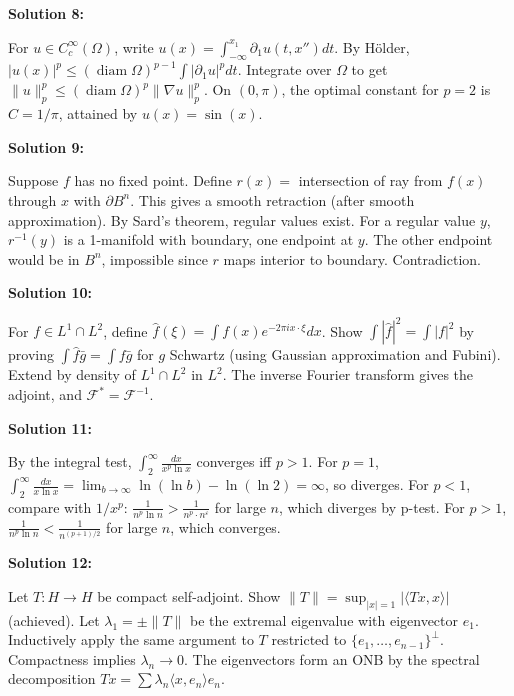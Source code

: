 \documentclass[12pt,a4paper]{exam}
\begin{document}
\vspace{0.5cm}

\textbf{Solution 8:}

For $u \in C_c^\infty(\Omega)$, write $u(x) = \int_{-\infty}^{x_1} \partial_1 u(t, x'') dt$. By H\"older, $|u(x)|^p \leq (\operatorname{diam}\Omega)^{p-1} \int |\partial_1 u|^p dt$. Integrate over $\Omega$ to get $\|u\|_p^p \leq (\operatorname{diam}\Omega)^p \|\nabla u\|_p^p$. On $(0,\pi)$, the optimal constant for $p=2$ is $C = 1/\pi$, attained by $u(x) = \sin(x)$.

\vspace{0.5cm}

\textbf{Solution 9:}

Suppose $f$ has no fixed point. Define $r(x) =$ intersection of ray from $f(x)$ through $x$ with $\partial B^n$. This gives a smooth retraction (after smooth approximation). By Sard's theorem, regular values exist. For a regular value $y$, $r^{-1}(y)$ is a 1-manifold with boundary, one endpoint at $y$. The other endpoint would be in $B^n$, impossible since $r$ maps interior to boundary. Contradiction.

\vspace{0.5cm}

\textbf{Solution 10:}

For $f \in L^1 \cap L^2$, define $\widehat{f}(\xi) = \int f(x) e^{-2\pi i x \cdot \xi} dx$. Show $\int |\widehat{f}|^2 = \int |f|^2$ by proving $\int \widehat{f} \bar{g} = \int f \bar{g}$ for $g$ Schwartz (using Gaussian approximation and Fubini). Extend by density of $L^1 \cap L^2$ in $L^2$. The inverse Fourier transform gives the adjoint, and $\mathcal{F}^* = \mathcal{F}^{-1}$.

\vspace{0.5cm}

\textbf{Solution 11:}

By the integral test, $\int_2^{\infty} \frac{dx}{x^p \ln x}$ converges iff $p > 1$. For $p=1$, $\int_2^{\infty} \frac{dx}{x \ln x} = \lim_{b \to \infty} \ln(\ln b) - \ln(\ln 2) = \infty$, so diverges. For $p<1$, compare with $1/x^p$: $\frac{1}{n^p \ln n} > \frac{1}{n^p \cdot n^{\varepsilon}}$ for large $n$, which diverges by p-test. For $p>1$, $\frac{1}{n^p \ln n} < \frac{1}{n^{(p+1)/2}}$ for large $n$, which converges.

\vspace{0.5cm}

\textbf{Solution 12:}

Let $T: H \to H$ be compact self-adjoint. Show $\|T\| = \sup_{|x|=1} |\langle Tx, x \rangle|$ (achieved). Let $\lambda_1 = \pm\|T\|$ be the extremal eigenvalue with eigenvector $e_1$. Inductively apply the same argument to $T$ restricted to $\{e_1,\ldots,e_{n-1}\}^\perp$. Compactness implies $\lambda_n \to 0$. The eigenvectors form an ONB by the spectral decomposition $Tx = \sum \lambda_n \langle x, e_n \rangle e_n$.
\end{document}
